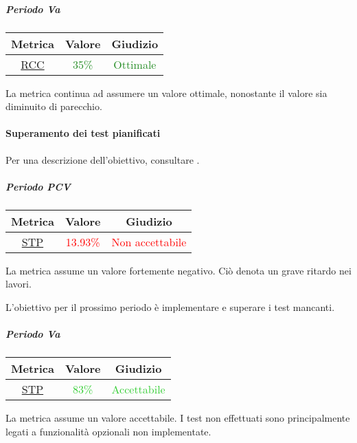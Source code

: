 			\subparagraph{Periodo Va}
			
			\begin{table}[H]
				\centering
				\begin{tabular}{  c | c | c}
					\hline
					\textbf{Metrica} & \textbf{Valore} & \textbf{Giudizio} \\
					\hline
					\hyperref[MMC]{RCC}   & \textcolor{ForestGreen}{35\%}          & \textcolor{ForestGreen}{Ottimale}  \\ \hline
				\end{tabular} 
			\end{table}	
			La metrica continua ad assumere un valore ottimale, nonostante il valore sia diminuito di parecchio.
			
			\newpage
			\paragraph{Superamento dei test pianificati}
			Per una descrizione dell'obiettivo, consultare .
				\subparagraph{Periodo PCV}
				
				\begin{table}[H]
					\centering
					\begin{tabular}{  c | c | c}
						\hline
						\textbf{Metrica} & \textbf{Valore} & \textbf{Giudizio} \\
						\hline
						\hyperref[MMC]{STP}   & \textcolor{Red}{13.93\%}          & \textcolor{Red}{Non accettabile}  \\ \hline
					\end{tabular} 
				\end{table}
				La metrica assume un valore fortemente negativo. Ciò denota un grave ritardo nei lavori.
				
				L'obiettivo per il prossimo periodo è implementare e superare i test mancanti.
				
				\subparagraph{Periodo Va}
				
				\begin{table}[H]
					\centering
					\begin{tabular}{  c | c | c}
						\hline
						\textbf{Metrica} & \textbf{Valore} & \textbf{Giudizio} \\
						\hline
						\hyperref[MMC]{STP}   & \textcolor{LimeGreen}{83\%}          & \textcolor{LimeGreen}{Accettabile}  \\ \hline
					\end{tabular} 
				\end{table}
				La metrica assume un valore accettabile. I test non effettuati sono principalmente legati a funzionalità opzionali non implementate.
				
